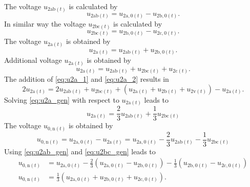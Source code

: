 \begin{solutionblock}
    The voltage $u_{\mathrm{2ab}(t)}$ is calculated by 
    \begin{equation}
        u_{\mathrm{2ab}(t)} =  u_{\mathrm{2a,0}(t)} - u_{\mathrm{2b,0}(t)}.
        \label{eq:u2ab_gen}        
    \end{equation}    
    In similar way the voltage $u_{\mathrm{2bc}(t)}$ is calculated by
    \begin{equation}
        u_{\mathrm{2bc}(t)} =  u_{\mathrm{2b,0}(t)} - u_{\mathrm{2c,0}(t)}.
        \label{eq:u2bc_gen}        
    \end{equation}    
    The voltage $u_{\mathrm{2a}(t)}$ is obtained by
    \begin{equation}
        u_{\mathrm{2a}(t)} =  u_{\mathrm{2ab}(t)} + u_{\mathrm{2b,0}(t)}.
        \label{eq:u2a_1}        
    \end{equation}    
    Additional voltage $u_{\mathrm{2a}(t)}$ is obtained by
    \begin{equation}
        u_{\mathrm{2a}(t)} =  u_{\mathrm{2ab}(t)} +  u_{\mathrm{2bc}(t)} + u_{\mathrm{2c}(t)}.
        \label{eq:u2a_2}        
    \end{equation}    
    The addition of \eqref{eq:u2a_1} and \eqref{eq:u2a_2} results in
    \begin{equation}
        2u_{\mathrm{2a}(t)} =  2u_{\mathrm{2ab}(t)} +  u_{\mathrm{2bc}(t)} 
                               + \left( u_{\mathrm{2a}(t)} + u_{\mathrm{2b}(t)} + u_{\mathrm{2v}(t)}\right)
                               - u_{\mathrm{2a}(t)}.
        \label{eq:u2a_gen}        
    \end{equation}    
    Solving \eqref{eq:u2a_gen} with respect to $u_{\mathrm{2a}(t)}$ leads to
    \begin{equation}
        u_{\mathrm{2a}(t)} = \frac{2}{3} u_{\mathrm{2ab}(t)} + \frac{1}{3} u_{\mathrm{2bc}(t)} 
    \end{equation}    
    The voltage $u_{\mathrm{0,n}(t)}$ is obtained by    
    \begin{equation}
        u_{\mathrm{0,n}(t)} = u_{\mathrm{2a,0}(t)} - u_{\mathrm{2a}(t)} 
        = u_{\mathrm{2a,0}(t)} - \frac{2}{3} u_{\mathrm{2ab}(t)} - \frac{1}{3} u_{\mathrm{2bc}(t)}
    \end{equation}
    Using \eqref{eq:u2ab_gen} and \eqref{eq:u2bc_gen} leads to
    \begin{equation}
        \begin{split}
        u_{\mathrm{0,n}(t)} &= u_{\mathrm{2a,0}(t)} - \frac{2}{3} \left( u_{\mathrm{2a,0}(t)} - u_{\mathrm{2b,0}(t)} \right) 
        - \frac{1}{3} \left( u_{\mathrm{2b,0}(t)} - u_{\mathrm{2c,0}(t)} \right) \\
        u_{\mathrm{0,n}(t)} &= \frac{1}{3} \left( u_{\mathrm{2a,0}(t)} + u_{\mathrm{2b,0}(t)} + u_{\mathrm{2c,0}(t)} \right).
        \end{split}
    \end{equation}
\end{solutionblock}

